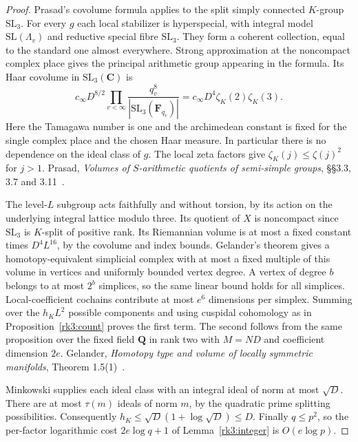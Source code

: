\begin{proof}
Prasad's covolume formula applies to the split simply connected
\(K\)-group \(\mathrm{SL}_3\). For every \(g\) each local stabilizer
is hyperspecial, with integral model \(\mathrm{SL}(\Lambda_v)\)
and reductive special fibre \(\mathrm{SL}_3\). They form a coherent
collection, equal to the standard one almost everywhere. Strong
approximation at the noncompact complex place gives the principal
arithmetic group appearing in the formula. Its Haar covolume in
\(\mathrm{SL}_3(\mathbf C)\) is
\[
 c_\infty D^{8/2}\prod_{v<\infty}
   \frac{q_v^8}{|\mathrm{SL}_3(\mathbf F_{q_v})|}
 =c_\infty D^4\zeta_K(2)\zeta_K(3).
\]
Here the Tamagawa number is one and the archimedean constant is
fixed for the single complex place and the chosen Haar measure.
In particular there is no dependence on the ideal class of \(g\).
The local zeta factors give \(\zeta_K(j)\le\zeta(j)^2\) for \(j>1\).
Prasad,
\emph{Volumes of \(S\)-arithmetic quotients of semi-simple groups},
\S\S3.3, 3.7 and 3.11~\cite{prasadVolume}.

The level-\(L\) subgroup acts faithfully and without torsion, by
its action on the underlying integral lattice modulo three. Its
quotient of \(X\) is noncompact since \(\mathrm{SL}_3\) is \(K\)-split
of positive rank. Its Riemannian volume is at most a fixed constant
times \(D^4L^{16}\), by the covolume and index bounds. Gelander's
theorem gives a homotopy-equivalent simplicial complex with at most
a fixed multiple of this volume in vertices and uniformly bounded
vertex degree. A vertex of degree \(b\) belongs to at most \(2^b\)
simplices, so the same linear bound holds for all simplices.
Local-coefficient cochains contribute at most \(e^6\) dimensions per
simplex. Summing over the \(h_K L^2\) possible components and
using cuspidal cohomology as in Proposition~\ref{rk3:count} proves
the first term. The second follows from the same proposition over
the fixed field \(\mathbf Q\) in rank two with \(M=ND\) and
coefficient dimension \(2e\).
Gelander,
\emph{Homotopy type and volume of locally symmetric manifolds},
Theorem 1.5(1)~\cite{gelanderVolume}.

Minkowski supplies each ideal class with an integral ideal of norm
at most \(\sqrt D\). There are at most \(\tau(m)\) ideals of norm
\(m\), by the quadratic prime splitting possibilities. Consequently
\(h_K\le\sqrt D(1+\log\sqrt D)\le D\).
Finally \(q\le p^2\), so the per-factor logarithmic cost
\(2e\log q+1\) of Lemma~\ref{rk3:integer} is \(O(e\log p)\).
\end{proof}

